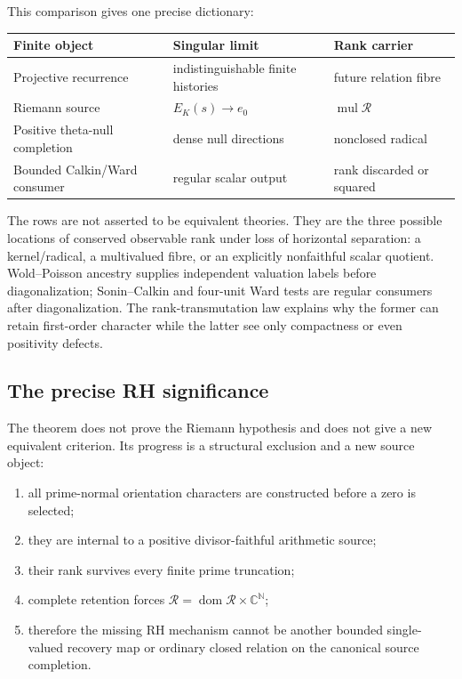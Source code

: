 \documentclass[11pt]{article}
\theoremstyle{definition}
\theoremstyle{remark}
\newcommand{\C}{\mathbb C}
\newcommand{\N}{\mathbb N}
\newcommand{\cR}{\mathcal R}
\newcommand{\mul}{\operatorname{mul}}
\begin{document}
This comparison gives one precise dictionary:
\begin{center}
\small
\begin{tabular}{
  >{\raggedright\arraybackslash}p{}
  >{\raggedright\arraybackslash}p{}
  >{\raggedright\arraybackslash}p{}}
\toprule
\textbf{Finite object} & \textbf{Singular limit} & \textbf{Rank carrier}\\
\midrule
Projective recurrence & indistinguishable finite histories
   & future relation fibre\\
Riemann source & \(E_K(s)\to e_0\)
   & \(\mul\cR\)\\
Positive theta-null completion & dense null directions
   & nonclosed radical\\
Bounded Calkin/Ward consumer & regular scalar output
   & rank discarded or squared\\
\bottomrule
\end{tabular}
\end{center}
The rows are not asserted to be equivalent theories.  They are the three
possible locations of conserved observable rank under loss of horizontal
separation: a kernel/radical, a multivalued fibre, or an explicitly
nonfaithful scalar quotient.  Wold--Poisson ancestry supplies independent
valuation labels before diagonalization; Sonin--Calkin and four-unit Ward
tests are regular consumers after diagonalization.  The rank-transmutation
law explains why the former can retain first-order character while the latter
see only compactness or even positivity defects.

\subsection{The precise RH significance}

The theorem does not prove the Riemann hypothesis and does not give a new
equivalent criterion.  Its progress is a structural exclusion and a new
source object:

\begin{enumerate}[leftmargin=2.1em]
\item all prime-normal orientation characters are constructed before a zero
      is selected;
\item they are internal to a positive divisor-faithful arithmetic source;
\item their rank survives every finite prime truncation;
\item complete retention forces
      \(\cR=\operatorname{dom}\cR\times\C^\N\);
\item therefore the missing RH mechanism cannot be another bounded
      single-valued recovery map or ordinary closed relation on the canonical
      source completion.
\end{enumerate}
\end{document}
